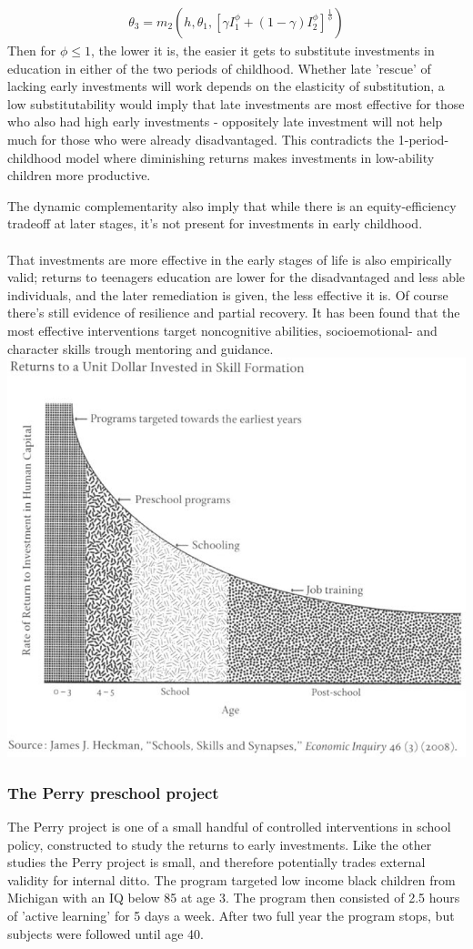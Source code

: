 \documentclass[12pt, a4paper]{article}
\begin{document}
\begin{multicols}{2}
\begin{align*}
\theta_3 = m_2(h, \theta_1, [\gamma I_1^{\phi}+ (1- \gamma)I_2^{\phi} ]^{\frac{1}{\phi}} )
\end{align*}
Then for $\phi \leq 1$, the lower it is, the easier it gets to substitute investments in education in either of the two periods of childhood. Whether late 'rescue' of lacking early investments will work depends on the elasticity of substitution, a low substitutability would imply that late investments are most effective for those who also had high early investments - oppositely late investment will not help much for those who were already disadvantaged. This contradicts the 1-period-childhood model where diminishing returns makes investments in low-ability children more productive.

The dynamic complementarity also imply that while there is an equity-efficiency tradeoff at later stages, it's not present for investments in early childhood.
\\ \\
That investments are more effective in the early stages of life is also empirically valid; returns to teenagers education are lower for the disadvantaged and less able individuals, and the later remediation is given, the less effective it is. Of course there's still evidence of resilience and partial recovery. It has been found that the most effective interventions target noncognitive abilities, socioemotional- and character skills trough mentoring and guidance.
\includegraphics[width = 0.5 \textwidth]{returns.jpg}

\subsubsection{The Perry preschool project}
The Perry project is one of a small handful of controlled interventions in school policy, constructed to study the returns to early investments. Like the other studies the Perry project is small, and therefore potentially trades external validity for internal ditto. The program targeted low income black children from Michigan with an IQ below 85 at age 3. The program then consisted of 2.5 hours of 'active learning' for 5 days a week. After two full year the program stops, but subjects were followed until age 40.


\end{multicols}
\end{document}
